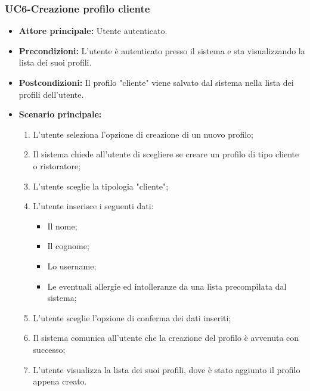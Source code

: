 \subsubsection{UC6-Creazione profilo cliente}
\begin{itemize}
    \item \textbf{Attore principale:} Utente autenticato.
    \item \textbf{Precondizioni:} L'utente è autenticato presso il sistema e sta visualizzando
    la lista dei suoi profili.
    \item \textbf{Postcondizioni:} Il profilo "cliente" viene salvato dal sistema nella lista dei profili
    dell'utente.
    \item \textbf{Scenario principale:}
    \begin{enumerate}
        \item L'utente seleziona l'opzione di creazione di un nuovo profilo;
        \item Il sistema chiede all'utente di scegliere se creare un profilo di tipo cliente
        o ristoratore;
        \item L'utente sceglie la tipologia "cliente";
        \item L'utente inserisce i seguenti dati:
        \begin{itemize}
            \item Il nome;
            \item Il cognome;
            \item Lo username;
            \item Le eventuali allergie ed intolleranze da una lista precompilata dal sistema;
        \end{itemize}
        \item L'utente sceglie l'opzione di conferma dei dati inseriti;
        \item Il sistema comunica all'utente che la creazione del profilo è avvenuta con successo;
        \item L'utente visualizza la lista dei suoi profili, dove è stato aggiunto il profilo appena creato.
    \end{enumerate}
\end{itemize}

